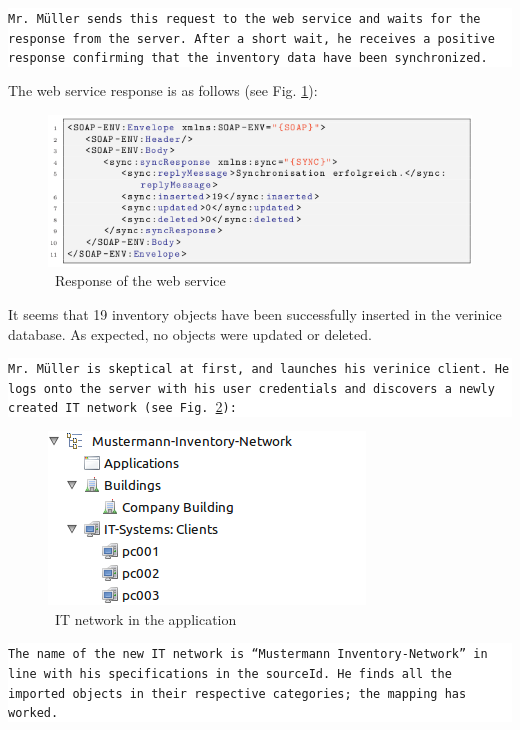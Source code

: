 \documentclass[a4paper,10pt]{book}
\begin{document}
\colorbox{white}{\parbox{\textwidth}{
{\tt Mr. Müller sends this request to the web service and waits for the response from the server. After a short wait,
he receives a positive response confirming that the inventory data have been synchronized.}
}}
\newline\newline
The web service response is as follows (see Fig. \ref{Response of the web service}):
\newline
\begin{figure}[htb!]
  \centering
  \includegraphics[scale=.7]{Screenshot/SyncAPI_Fallstudie_08-en.png}
  \caption{\label{Response of the web service} \ Response of the web service}
\end{figure}
\newline
It seems that 19 inventory objects have been successfully inserted in the verinice database. As expected, no
objects were updated or deleted.
\newline\newline
\colorbox{white}{\parbox{\textwidth}{
{\tt Mr. Müller is skeptical at first, and launches his verinice client. He logs onto the server with his user
credentials and discovers a newly created IT network (see Fig. \ref{IT network in the application}):}
}}\newline\newline
\begin{figure}[htb!]
  \centering
  \includegraphics[scale=.7]{Screenshot/Verinice_client_screenshot-en.png}
  \caption{\label{IT network in the application} \ IT network in the application}
\end{figure}
\newline
 \newline\newline
\colorbox{white}{\parbox{\textwidth}{
{\tt The name of the new IT network is ``Mustermann Inventory-Network'' in line with his specifications in the sourceId. He
finds all the imported objects in their respective categories; the mapping has worked.}
}}\newline\newline
\end{document}
